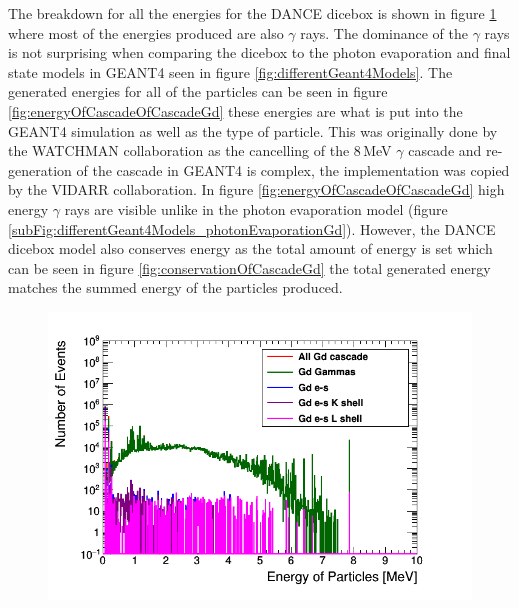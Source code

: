 The breakdown for all the energies for the DANCE dicebox is shown in figure \ref{fig:gadoliniumEnergiesCascade} where most of the energies produced are also $\gamma$ rays. The dominance of the $\gamma$ rays is not surprising when comparing the dicebox to the photon evaporation and final state models in GEANT4 seen in figure \ref{fig:differentGeant4Models}. The generated energies for all of the particles can be seen in figure \ref{fig:energyOfCascadeOfCascadeGd} these energies are what is put into the GEANT4 simulation as well as the type of particle. This was originally done by the WATCHMAN collaboration as the cancelling of the 8\,MeV $\gamma$ cascade and re-generation of the cascade in GEANT4 is complex, the implementation was copied by the VIDARR collaboration. In figure \ref{fig:energyOfCascadeOfCascadeGd} high energy $\gamma$ rays are visible unlike in the photon evaporation model (figure \ref{subFig:differentGeant4Models_photonEvaporationGd}). However, the DANCE dicebox model also conserves energy as the total amount of energy is set which can be seen in figure  \ref{fig:conservationOfCascadeGd} the total generated energy matches the summed energy of the particles produced. 

\begin{figure}[htbp]
 \centering
 \includegraphics[width=0.7\linewidth]{Chapter4/Figs/Raster/gadolinium/gadoliniumEnergiesCascade.png}
 \label{fig:gadoliniumEnergiesCascade}
\end{figure}


